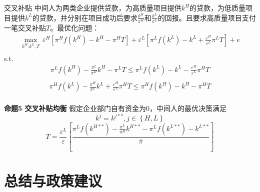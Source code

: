 \documentclass{beamer}
\begin{document}
\begin{frame}{交叉补贴}
	中间人为两类企业提供贷款，为高质量项目提供$k^H$的贷款，为低质量项目提供$k^L$的贷款，并分别在项目成功后要求$\frac{k^H}{\pi^H}$和$\frac{k^L}{\pi^L}$的回报。且要求高质量项目支付一笔交叉补贴$T$。最优化问题：
	$$\begin{matrix}
		\underset{{{k}^{H}}.{{k}^{L}},T}{\mathop{\max }}\,{{\varepsilon }^{H}}\left[ {{\pi }^{H}}f\left( {{k}^{H}} \right)-{{k}^{H}}-{{\pi }^{H}}T \right]+{{\varepsilon }^{L}}\left[ {{\pi }^{L}}f\left( {{k}^{L}} \right)-{{k}^{L}}+\frac{{{\varepsilon }^{H}}}{{{\varepsilon }^{L}}}{{\pi }^{L}}T \right]+e  \\
	\end{matrix}$$
	s.t.
	$$\begin{matrix}
		{{\pi }^{L}}f\left( {{k}^{H}} \right)-\frac{{{\pi }^{L}}}{{{\pi }^{H}}}{{k}^{H}}-{{\pi }^{L}}T\le {{\pi }^{L}}f\left( {{k}^{L}} \right)-{{k}^{L}}-\frac{{{\varepsilon }^{H}}}{{{\varepsilon }^{L}}}{{\pi }^{H}}T  \\
	\end{matrix}$$
	$$\begin{matrix}
		{{\pi }^{H}}f\left( {{k}^{L}} \right)-\frac{{{\pi }^{H}}}{{{\pi }^{L}}}{{k}^{L}}+\frac{{{\varepsilon }^{H}}}{{{\varepsilon }^{L}}}{{\pi }^{H}}T\le {{\pi }^{H}}f\left( {{k}^{H}} \right)-{{k}^{H}}-{{\pi }^{H}}T  \\
	\end{matrix}$$
\end{frame}

\begin{frame}
	\textbf{命题5 交叉补贴均衡}
	假定企业部门自有资金为0，中间人的最优决策满足
	$${{k}^{j}}={{k}^{j**}},j\in \left\{ H,L \right\}$$
	$$T=\frac{{{\varepsilon }^{L}}}{\varepsilon }\left[ \frac{{{\pi }^{L}}f\left( {{k}^{H**}} \right)-\frac{{{\pi }^{L}}}{{{\pi }^{H}}}{{k}^{H**}}-{{\pi }^{L}}f\left( {{k}^{L**}} \right)-{{k}^{L**}}}{{\bar{\pi }}} \right]$$
	
\end{frame}


\section{总结与政策建议}
\end{document}
